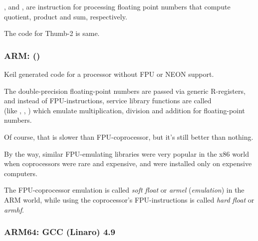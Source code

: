 ,  and , 
are instruction for processing floating point numbers that compute \gls{quotient}, 
\gls{product} and sum, respectively.

The code for Thumb-2 is same.

\subsubsection{ARM: \OptimizingKeilVI (\ThumbMode)}



Keil generated code for a processor without FPU or NEON support.

The double-precision floating-point numbers are passed via generic R-registers,
and instead of FPU-instructions, service library functions are called\\
(like , , )
which emulate multiplication, division and addition for floating-point numbers.

Of course, that is slower than FPU-coprocessor, but it's still better than nothing.

By the way, similar FPU-emulating libraries were very popular in the x86 world when coprocessors were rare
and expensive, and were installed only on expensive computers.


The FPU-coprocessor emulation is called \emph{soft float} or \emph{armel} (\emph{emulation}) in the ARM world, 
while using the coprocessor's FPU-instructions is called \emph{hard float} or \emph{armhf}.

\iffalse
\myindex{Raspberry Pi}

For example, the Linux kernel for Raspberry Pi is compiled in two variants.

In the \emph{soft float} case, arguments are passed via R-registers, and in the \emph{hard float} case---via D-registers.

And that is what stops you from using armhf-libraries from armel-code or vice versa,
and that is why all the code in Linux distributions must be compiled according to a single convention.
\fi

\subsubsection{ARM64: \Optimizing GCC (Linaro) 4.9}


